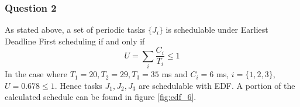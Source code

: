 \subsubsection{Question 2}

As stated above, a set of periodic tasks $\{J_i\}$ is schedulable under Earliest
Deadline First scheduling if and only if
$$U = \sum_{i} \dfrac{C_i}{T_i} \leq 1$$
In the case where $T_1 = 20, T_2 = 29, T_3 = 35$ ms and $C_i = 6$ ms,
$i=\{1,2,3\}$, $U=0.678 \leq 1$. Hence tasks $J_1, J_2, J_3$ are schedulable
with EDF. A portion of the calculated schedule can be found in
figure \ref{fig:edf_6}.
